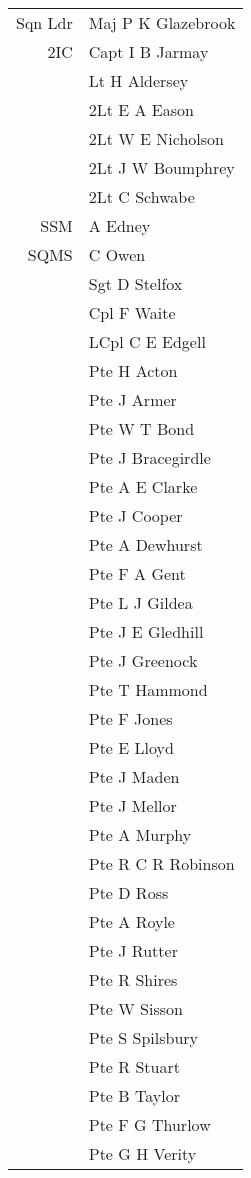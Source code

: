 \begin{center}
  \begin{tabular}{rl}
    Sqn Ldr & Maj P K Glazebrook \\
    2IC & Capt I B Jarmay \\
    & Lt H Aldersey \\
    & 2Lt E A Eason \\
    & 2Lt W E Nicholson \\
    & 2Lt J W Boumphrey \\
    & 2Lt C Schwabe \\
    SSM & A Edney \\
    SQMS & C Owen \\
    & Sgt D Stelfox \\
    & Cpl F Waite \\
    & LCpl C E Edgell \\
    & Pte H Acton \\
    & Pte J Armer \\
    & Pte W T Bond \\
    & Pte J Bracegirdle \\
    & Pte A E Clarke \\
    & Pte J Cooper \\
    & Pte A Dewhurst \\
    & Pte F A Gent \\
    & Pte L J Gildea \\
    & Pte J E Gledhill \\
    & Pte J Greenock \\
    & Pte T Hammond \\
    & Pte F Jones \\
    & Pte E Lloyd \\
    & Pte J Maden \\
    & Pte J Mellor \\
    & Pte A Murphy \\
    & Pte R C R Robinson \\
    & Pte D Ross \\
    & Pte A Royle \\
    & Pte J Rutter \\
    & Pte R Shires \\
    & Pte W Sisson \\
    & Pte S Spilsbury \\
    & Pte R Stuart \\
    & Pte B Taylor \\
    & Pte F G Thurlow \\
    & Pte G H Verity \\

\end{tabular}
\end{center}

